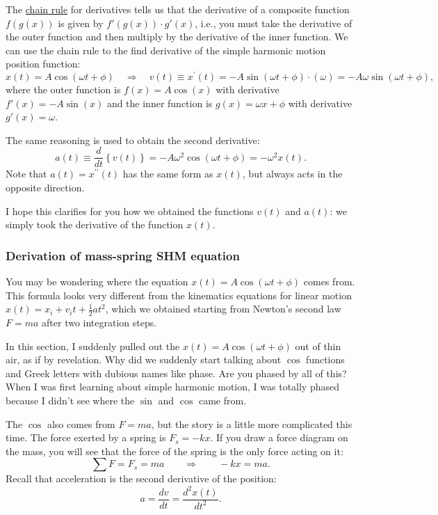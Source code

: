 \documentclass[letterpaper,9pt,journal]{IEEEtran}
\begin{document}
The \hyperref[5dfdb867806a445d5fd86b759e7e07ed]{chain rule} for derivatives tells us that
the derivative of a composite function $f(g(x))$ is given by $f'(g(x))\cdot g'(x)$,
i.e., you must take the derivative of the outer function and then multiply by 
the derivative of the inner function.
We can use the chain rule to the find derivative of the simple harmonic motion position function:
\[
 x(t)=A\cos(\omega t +\phi) 
 \quad \Rightarrow \quad
 v(t) \equiv x^{\prime}(t)=-A\sin(\omega t +\phi)\cdot(\omega)  = -A\omega\sin(\omega t +\phi),
\]
where the outer function is $f(x)=A\cos(x)$ with derivative $f'(x)=-A\sin(x)$
and the inner function is $g(x)=\omega x +\phi$ with derivative $g'(x)=\omega$.

The same reasoning is used to obtain the second derivative: 
\[
 a(t)\equiv \frac{d}{dt}\!\left\{ v(t) \right\} =-A\omega^2 \cos(\omega t +\phi) = -\omega^2 x(t).
\]
Note that $a(t)=x^{\prime\prime}(t)$ has the same form as $x(t)$, 
but always acts in the opposite direction.

I hope this clarifies for you how we obtained the functions $v(t)$ and $a(t)$:
we simply took the derivative of the function $x(t)$.


\subsubsection{Derivation of mass-spring SHM equation}

You may be wondering where the equation $x(t)=A\cos(\omega t + \phi)$ comes from.
This formula looks very different from the kinematics equations for linear motion
$x(t) = x_i + v_it + \frac{1}{2}at^2$, 
which we obtained starting from Newton's second law $F=ma$ after two integration steps. 

In this section, I suddenly pulled out the $x(t)=A\cos(\omega t + \phi)$ out of thin air,
as if by revelation. Why did we suddenly start talking about $\cos$ functions and 
Greek letters with dubious names like phase.  Are you phased by all of this?
When I was first learning about simple harmonic motion, I was totally phased because 
I didn't see where the $\sin$ and $\cos$ came from. 

The $\cos$ also comes from $F=ma$, but the story is a little more complicated this time.
The force exerted by a spring is $F_{s} = -kx$.
If you draw a force diagram on the mass, you will see
that the force of the spring is the only force acting on it:
\[
 \sum F = F_s =ma   
 \qquad \Rightarrow \qquad  
 -kx  	= ma.
\]
Recall that acceleration is the second derivative of the position:
\[
 a=\frac{dv}{dt} = \frac{d^2x(t)}{dt^2}.
\]
\end{document}
